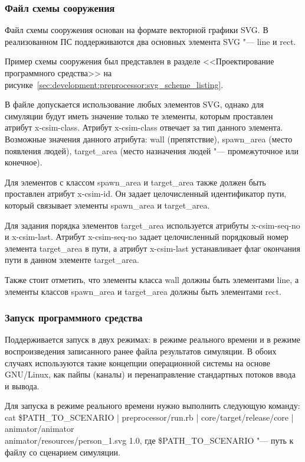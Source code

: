 \subsubsection{Файл схемы сооружения}
\label{sec:manual:input:building_scheme}

Файл схемы сооружения основан на формате векторной графики SVG.
В реализованном ПС поддерживаются два основных элемента SVG "--- line и rect.

Пример схемы сооружения был представлен в разделе <<Проектирование программного средства>> на рисунке~\ref{sec:development:preprocessor:svg_scheme_listing}.

В файле допускается использование любых элементов SVG, однако для симуляции будут иметь значение только те элементы, которым проставлен атрибут x-csim-class.
Атрибут x-csim-class отвечает за тип данного элемента.  Возможные значения данного атрибута:
  wall (препятствие),
  spawn\_area (место появления людей),
  target\_area (место назначения людей "--- промежуточное или конечное).

Для элементов с классом spawn\_area и target\_area также должен быть проставлен атрибут x-csim-id.
Он задает целочисленный идентификатор пути, который связывает элементы spawn\_area и target\_area.

Для задания порядка элементов target\_area используется атрибуты x-csim-seq-no и x-csim-last.
Атрибут x-csim-seq-no задает целочисленный порядковый номер элемента target\_area в пути,
а атрибут x-csim-last устанавливает флаг окончания пути в данном элементе target\_area.

Также стоит отметить, что элементы класса wall должны быть элементами line,
а элементы классов spawn\_area и target\_area должны быть элементами rect.

\subsubsection{Запуск программного средства}
\label{sec:manual:launch}

Поддерживается запуск в двух режимах: в режиме реального времени и в режиме воспроизведения записанного ранее файла результатов симуляции.
В обоих случаях используются такие концепции операционной системы на основе GNU/Linux, как пайпы (каналы) и перенаправление стандартных потоков ввода и вывода.

Для запуска в режиме реального времени нужно выполнить следующую команду: \\
cat \$PATH\_TO\_SCENARIO \-|\- preprocessor/run.rb \-|\- core/target/release/core \-|\- animator/animator \\ animator/resources/person\_1.svg 1.0,
где \$PATH\_TO\_SCENARIO "--- путь к файлу со сценарием симуляции.

